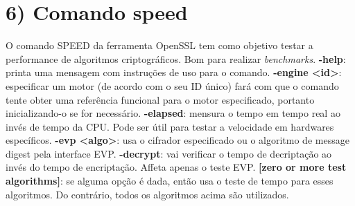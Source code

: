 \documentclass[a4paper,11pt]{article}
\theoremstyle{mytheor}
\begin{document}
\section*{6) Comando speed}
O comando SPEED da ferramenta OpenSSL tem como objetivo testar a performance de algoritmos criptográficos. Bom para realizar \textit{benchmarks}.
\newline\newline
\noindent \textbf{-help}: printa uma mensagem com instruções de uso para o comando.
\newline\newline
\noindent \textbf{-engine <id>}: especificar um motor (de acordo com o seu ID único) fará com que o comando tente obter uma referência funcional para o motor especificado, portanto inicializando-o se for necessário. 
\newline\newline
\noindent \textbf{-elapsed}: mensura o tempo em tempo real ao invés de tempo da CPU. Pode ser útil para testar a velocidade em hardwares específicos.
\newline\newline
\noindent \textbf{-evp <algo>}: usa o cifrador especificado ou o algoritmo de message digest pela interface EVP.
\newline\newline
\noindent \textbf{-decrypt}: vai verificar o tempo de decriptação ao invés do tempo de encriptação. Affeta apenas o teste EVP. 
\newline\newline
\noindent \textbf{[zero or more test algorithms]}: se alguma opção é dada, então usa o teste de tempo para esses algoritmos. Do contrário, todos os algoritmos acima são utilizados.
\newline\newline
\end{document}
